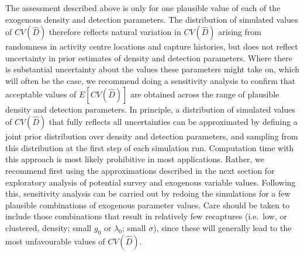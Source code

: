 \documentclass[a4paper,11pt, draft]{article} %
\begin{document}
The assessment described above is only for one plausible value of each of the exogenous density and detection parameters. The distribution of simulated values of $CV(\hat{D})$ therefore reflects natural variation in $CV(\hat{D})$ arising from randomness in activity centre locations and capture histories, but does not reflect uncertainty in prior estimates of density and detection parameters. Where there is substantial uncertainty about the values these parameters might take on, which will often be the case, we recommend doing a sensitivity analysis to confirm that acceptable values of $E[CV(\hat{D})]$ are obtained across the range of plausible density and detection parameters. In principle, a distribution of simulated values of $CV(\hat{D})$ that fully reflects all uncertainties can be approximated by defining a joint prior distribution over density and detection parameters, and sampling from this distribution at the first step of each simulation run. Computation time with this approach is most likely prohibitive in most applications. Rather, we recommend first using the approximations described in the next section for exploratory analysis of potential survey and exogenous variable values. Following this, sensitivity analysis can be carried out by redoing the simulations for a few plausible combinations of exogenous parameter values. Care should be taken to include those combinations that result in relatively few recaptures (i.e.\ low, or clustered, density; small $g_0$ or $\lambda_0$; small $\sigma$), since these will generally lead to the most unfavourable values of $CV(\hat{D})$.
\end{document}
